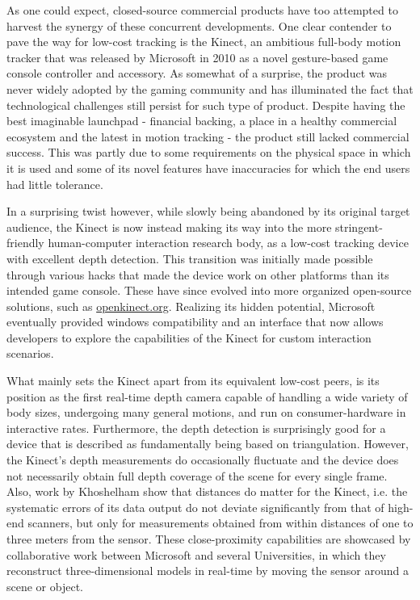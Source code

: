 As one could expect, closed-source commercial products have too attempted to harvest the synergy of these concurrent developments. One clear contender to pave the way for low-cost tracking is the Kinect, an ambitious full-body motion tracker that was released by Microsoft in 2010 as a novel gesture-based game console controller and accessory. As somewhat of a surprise, the product was never widely adopted by the gaming community and has illuminated the fact that technological challenges still persist for such type of product. Despite having the best imaginable launchpad - financial backing, a place in a healthy commercial ecosystem and the latest in motion tracking - the product still lacked commercial success. This was partly due to some requirements on the physical space in which it is used and some of its novel features have inaccuracies for which the end users had little tolerance\cite{WhyXBoxFailed}. 

In a surprising twist however, while slowly being abandoned by its original target audience, the Kinect is now instead making its way into the more stringent-friendly human-computer interaction research body, as a low-cost tracking device with excellent depth detection. This transition was initially made possible through various hacks that made the device work on other platforms than its intended game console. These have since evolved into more organized open-source solutions, such as \href{https://openkinect.org/}{openkinect.org}. Realizing its hidden potential, Microsoft eventually provided windows compatibility and an interface that now allows developers to explore the capabilities of the Kinect for custom interaction scenarios. 

What mainly sets the Kinect apart from its equivalent low-cost peers, is its position as the first real-time depth camera capable of handling a wide variety of body sizes, undergoing many general motions, and run on consumer-hardware in interactive rates\cite{KinectPartTwo}. Furthermore, the depth detection is surprisingly good for a device that is described as fundamentally being based on triangulation\cite{KinectWorks}. However, the Kinect's depth measurements do occasionally fluctuate and the device does not necessarily  obtain full depth coverage of the scene for every single frame\cite{Kinect3DExp}. Also, work by Khoshelham\cite{KinectAcc} show that distances do matter for the Kinect, i.e. the systematic errors of its data output do not deviate significantly from that of high-end scanners, but only for measurements obtained from within distances of one to three meters from the sensor. These close-proximity capabilities are showcased by collaborative work between Microsoft and several Universities\cite{Kinect3DExp}, in which they reconstruct three-dimensional models in real-time by moving the sensor around a scene or object.

